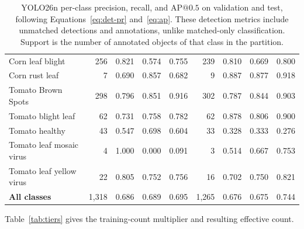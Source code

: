 \documentclass[a4paper,8pt]{article}
\begin{document}
\begin{table}[H]
\begin{tabularx}{\textwidth}{|>{\raggedright\arraybackslash}X|r|r|r|r||r|r|r|r|}
Corn leaf blight & 256 & 0.821 & 0.574 & 0.755 & 239 & 0.810 & 0.669 & 0.800\\
Corn rust leaf & 7 & 0.690 & 0.857 & 0.682 & 9 & 0.887 & 0.877 & 0.918\\
Tomato Brown Spots & 298 & 0.796 & 0.851 & 0.916 & 302 & 0.787 & 0.844 & 0.903\\
Tomato blight leaf & 62 & 0.731 & 0.758 & 0.782 & 62 & 0.878 & 0.806 & 0.900\\
Tomato healthy & 43 & 0.547 & 0.698 & 0.604 & 33 & 0.328 & 0.333 & 0.276\\
Tomato leaf mosaic virus & 4 & 1.000 & 0.000 & 0.091 & 3 & 0.514 & 0.667 & 0.753\\
Tomato leaf yellow virus & 22 & 0.805 & 0.752 & 0.756 & 16 & 0.702 & 0.750 & 0.821\\
\hline
\textbf{All classes} & 1{,}318 & 0.686 & 0.689 & 0.695 & 1{,}265 & 0.676 & 0.675 & 0.744\\
\hline
\end{tabularx}
\caption{YOLO26n per-class precision, recall, and $\mathrm{AP}@0.5$ on validation and test,
following Equations~\eqref{eq:det-pr} and~\eqref{eq:ap}. These detection metrics include unmatched
detections and annotations, unlike matched-only classification. Support is the number of annotated objects of
that class in the partition.}
\label{tab:yolo-perclass}
\end{table}

Table~\ref{tab:tiers} gives the training-count multiplier and resulting effective count.
\end{document}
